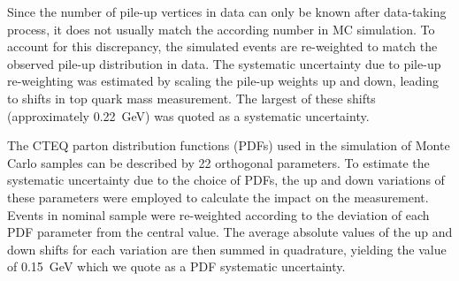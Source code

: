 \begin{description}[wide=\parindent]




\item [Pile-up.]
Since the number of pile-up vertices in data can only be known after data-taking process, it does not usually match the
according number in MC simulation. To account for this discrepancy, the simulated events are re-weighted to match the
observed pile-up distribution in data. The systematic uncertainty due to pile-up re-weighting was estimated by
scaling the pile-up weights up and down, leading to shifts in top quark mass measurement. The largest of these shifts
(approximately \SI{0.22}{\GeV}) was quoted as a systematic uncertainty.

\item [Parton distribution functions.]
The CTEQ parton distribution functions (PDFs) \autocite{CTEQ} used in the simulation of Monte Carlo samples can be
described by 22 orthogonal parameters. To estimate the systematic uncertainty due to the choice of PDFs, the up and down
variations of these parameters were employed to calculate the impact on the measurement. Events in nominal \ttjets
sample were re-weighted according to the deviation of each PDF parameter from the central value. The average absolute
values of the up and down shifts for each variation are then summed in quadrature, yielding the value of \SI{0.15}{\GeV}
which we quote as a PDF systematic uncertainty.


\end{description}
